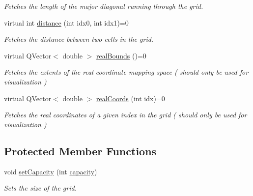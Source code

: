 \begin{DoxyCompactItemize}
\begin{DoxyCompactList}\small\item\em \-Fetches the length of the major diagonal running through the grid. \end{DoxyCompactList}\item 
\hypertarget{classhsom_1_1_grid_a91c2fe63cf5fdc2a9f82b4a09a7e0722}{virtual int \hyperlink{classhsom_1_1_grid_a91c2fe63cf5fdc2a9f82b4a09a7e0722}{distance} (int idx0, int idx1)=0}\label{classhsom_1_1_grid_a91c2fe63cf5fdc2a9f82b4a09a7e0722}

\begin{DoxyCompactList}\small\item\em \-Fetches the distance between two cells in the grid. \end{DoxyCompactList}\item 
\hypertarget{classhsom_1_1_grid_aadbdeb2f305d8549998866397450732f}{virtual \-Q\-Vector$<$ double $>$ \hyperlink{classhsom_1_1_grid_aadbdeb2f305d8549998866397450732f}{real\-Bounds} ()=0}\label{classhsom_1_1_grid_aadbdeb2f305d8549998866397450732f}

\begin{DoxyCompactList}\small\item\em \-Fetches the extents of the real coordinate mapping space ( should only be used for visualization ) \end{DoxyCompactList}\item 
\hypertarget{classhsom_1_1_grid_a9a40aeb6a5aea850e576224281f63504}{virtual \-Q\-Vector$<$ double $>$ \hyperlink{classhsom_1_1_grid_a9a40aeb6a5aea850e576224281f63504}{real\-Coords} (int idx)=0}\label{classhsom_1_1_grid_a9a40aeb6a5aea850e576224281f63504}

\begin{DoxyCompactList}\small\item\em \-Fetches the real coordinates of a given index in the grid ( should only be used for visualization ) \end{DoxyCompactList}\end{DoxyCompactItemize}
\subsection*{\-Protected \-Member \-Functions}
\begin{DoxyCompactItemize}
\item 
\hypertarget{classhsom_1_1_grid_a1a96dd2d3bfc55ab6968a55bc457460f}{void \hyperlink{classhsom_1_1_grid_a1a96dd2d3bfc55ab6968a55bc457460f}{set\-Capacity} (int \hyperlink{classhsom_1_1_grid_ae77f3109eaa4f66009f90d458bd28ed9}{capacity})}\label{classhsom_1_1_grid_a1a96dd2d3bfc55ab6968a55bc457460f}

\begin{DoxyCompactList}\small\item\em \-Sets the size of the grid. \end{DoxyCompactList}\end{DoxyCompactItemize}
